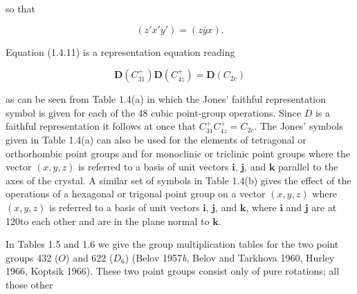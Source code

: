 \documentclass[11pt,a4paper,twoside,openright]{book}
\begin{document}
so that

\begin{equation*}
(z'x'y') = (z\bar{y}x).
\end{equation*}

Equation (1.4.11) is a representation equation reading

\begin{equation*}
\mathbf{D}(C_{31}^{+})\mathbf{D}(C_{4z}^{+}) = \mathbf{D}(C_{2c}) \tag{1.4.12}
\end{equation*}

as can be seen from Table 1.4(a) in which the Jones' faithful representation symbol is given for each of the 48 cubic point-group operations. Since $D$ is a faithful representation it follows at once that $C_{31}^{+}C_{4z}^{+} = C_{2c}$. The Jones' symbols given in Table 1.4(a) can also be used for the elements of tetragonal or orthorhombic point groups and for monoclinic or triclinic point groups where the vector $(x, y, z)$ is referred to a basis of unit vectors $\mathbf{i}$, $\mathbf{j}$, and $\mathbf{k}$ parallel to the axes of the crystal. A similar set of symbols in Table 1.4(b) gives the effect of the operations of a hexagonal or trigonal point group on a vector $(x, y, z)$ where $(x, y, z)$ is referred to a basis of unit vectors $\mathbf{i}$, $\mathbf{j}$, and $\mathbf{k}$, where $\mathbf{i}$ and $\mathbf{j}$ are at 120\textdegree  to each other and are in the plane normal to $\mathbf{k}$.

In Tables 1.5 and 1.6 we give the group multiplication tables for the two point groups 432 ($O$) and 622 ($D_{6}$) (Belov 1957\textit{b}, Belov and Tarkhova 1960, Hurley 1966, Koptsik 1966). These two point groups consist only of pure rotations; all those other
\end{document}
